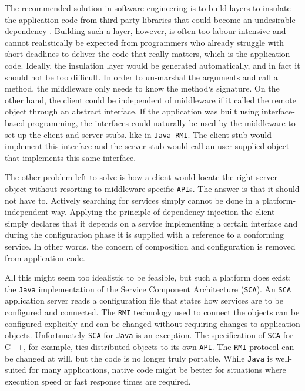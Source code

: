 The recommended solution in software engineering is to build layers to insulate
the application code from third-party libraries that could become an undesirable dependency \cite{Sommerville}.
Building such a layer, however, is often too labour-intensive and cannot realistically be expected from programmers
who already struggle with short deadlines to deliver the code that really matters, which is the application code.
Ideally, the insulation layer would be generated automatically, and in fact it should not be too difficult. In order
to un-marshal the arguments and call a method, the middleware only needs to know the method`s signature. On the
other hand, the client could be independent of middleware if it called the remote object through an abstract
interface. If the application was built using interface-based programming, \cite{Pugh} the interfaces could naturally
be used by the middleware to set up the client and server stubs. like in \texttt{\texttt{Java} \texttt{RMI}}. The client stub would
implement this interface and the server stub would call an user-supplied object that implements this same interface.

The other problem left to solve is how a client would locate the right server object without resorting to middleware-specific \texttt{API}s.
The answer is that it should not have to. Actively searching for services simply cannot be done in a platform-independent way.
Applying the principle of dependency injection \cite{Fowler2} the client simply declares that it depends on a service implementing
a certain interface and during the configuration phase it is supplied with a reference to a conforming service. In other words,
the concern of composition and configuration is removed from application code.

All this might seem too idealistic to be feasible, but such a platform does exist: the \texttt{Java} implementation of the Service Component
Architecture (\texttt{SCA}). An \texttt{SCA} application server reads a configuration file that states how services are to be configured
and connected. The \texttt{RMI} technology used to connect the objects can be configured explicitly and can be changed without requiring
changes to application objects. Unfortunately \texttt{SCA} for \texttt{Java} is an exception. The specification of \texttt{SCA} for C++, for example,
ties distributed objects to its own \texttt{API}. The \texttt{RMI} protocol can be changed at will, but the code is no longer truly portable.
While \texttt{Java} is well-suited for many applications, native code might be better for situations where execution speed or fast response
times are required.

